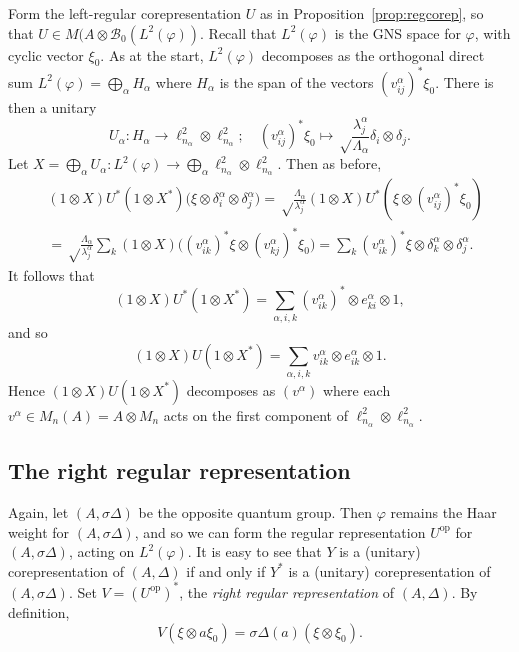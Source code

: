 \documentclass[twoside,a4paper,12pt]{article}
\theoremstyle{plain}
\theoremstyle{definition}
\newcommand{\mc}{\mathcal}
\newcommand{\op}{{\operatorname{op}}}
\begin{document}
Form the left-regular corepresentation $U$ as in
Proposition~\ref{prop:regcorep}, so that
$U\in M(A\otimes\mc B_0(L^2(\varphi))$.  Recall that $L^2(\varphi)$ is the
GNS space for $\varphi$, with cyclic vector $\xi_0$.  As at the start,
$L^2(\varphi)$ decomposes as the orthogonal direct sum $L^2(\varphi) =
\bigoplus_\alpha H_\alpha$ where $H_\alpha$ is the span of the vectors
$(v^\alpha_{ij})^*\xi_0$.  There is then a unitary
\[ U_\alpha : H_\alpha \rightarrow \ell^2_{n_\alpha} \otimes\ell^2_{n_\alpha};
\quad (v^\alpha_{ij})^*\xi_0 \mapsto \sqrt\frac{\lambda^\alpha_j}{\Lambda_\alpha}
\delta_i \otimes \delta_j. \]
Let $X=\bigoplus_\alpha U_\alpha: L^2(\varphi) \rightarrow \bigoplus_\alpha
\ell^2_{n_\alpha} \otimes\ell^2_{n_\alpha}$.  Then as before,
\begin{align*}
& (1\otimes X)U^*(1\otimes X^*)\big( \xi\otimes\delta^\alpha_i\otimes
\delta^\alpha_j \big) =
\sqrt\frac{\Lambda_\alpha}{\lambda^\alpha_j}
  (1\otimes X)U^*(\xi\otimes (v^\alpha_{ij})^*\xi_0) \\
&= \sqrt\frac{\Lambda_\alpha}{\lambda^\alpha_j}
  \sum_k (1\otimes X) \big( (v^\alpha_{ik})^*\xi \otimes
  (v^\alpha_{kj})^*\xi_0 \big)
= \sum_k (v^\alpha_{ik})^*\xi \otimes \delta^\alpha_k \otimes
  \delta^\alpha_j.
\end{align*}
It follows that
\[ (1\otimes X)U^*(1\otimes X^*)
= \sum_{\alpha,i,k} (v^\alpha_{ik})^* \otimes e_{ki}^\alpha \otimes 1, \]
and so
\[ (1\otimes X)U(1\otimes X^*)
= \sum_{\alpha,i,k} v^\alpha_{ik} \otimes e_{ik}^\alpha \otimes 1. \]
Hence $(1\otimes X)U(1\otimes X^*)$ decomposes as $(v^\alpha)$ where
each $v^\alpha \in M_n(A) = A \otimes M_n$ acts on the first component
of $\ell^2_{n_\alpha} \otimes \ell^2_{n_\alpha}$.


\subsection{The right regular representation}

Again, let $(A,\sigma\Delta)$ be the opposite quantum group.  Then $\varphi$
remains the Haar weight for $(A,\sigma\Delta)$, and so we can form the regular 
representation $U^\op$ for $(A,\sigma\Delta)$, acting on $L^2(\varphi)$.
It is easy to see that $Y$ is a (unitary) corepresentation of $(A,\Delta)$ if
and only if $Y^*$ is a
(unitary) corepresentation of $(A,\sigma\Delta)$.  Set $V=(U^\op)^*$, the
\emph{right regular representation} of $(A,\Delta)$.  By definition,
\[ V(\xi\otimes a\xi_0) = \sigma\Delta(a)(\xi\otimes\xi_0). \]
\end{document}
